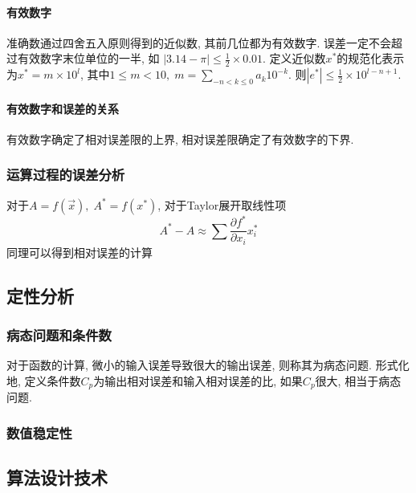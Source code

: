 \documentclass{ctexart}
\newcommand{\ud}{\,\mathrm{d}\,}
\begin{document}
\paragraph{有效数字}
    准确数通过四舍五入原则得到的近似数, 其前几位都为有效数字.
    误差一定不会超过有效数字末位单位的一半, 如
        $|3.14 - \pi| \le \frac{1}{2} \times 0.01$.
    定义近似数$x^*$的规范化表示为$x^* = m \times 10^l$,
    其中$1 \le m < 10,\; m = \sum_{-n < k \le 0} a_k 10^{-k}$.
    则$|e^*| \le \frac{1}{2} \times 10^{l-n+1}$.
\paragraph{有效数字和误差的关系} 有效数字确定了相对误差限的上界,
    相对误差限确定了有效数字的下界.
\subsubsection{运算过程的误差分析}
    对于$A=f(\vec{x}),\;A^*=f(x^*)$, 对于Taylor展开取线性项\[
        A^*-A \approx \sum \frac{\partial f^*}{\partial x_i} x^*_i\]
    同理可以得到相对误差的计算

\subsection{定性分析}
\subsubsection{病态问题和条件数}
    对于函数的计算, 微小的输入误差导致很大的输出误差, 则称其为病态问题.
    形式化地, 定义条件数$C_p$为输出相对误差和输入相对误差的比,
    如果$C_p$很大, 相当于病态问题.
\subsubsection{数值稳定性}

\subsection{算法设计技术}
\end{document}
